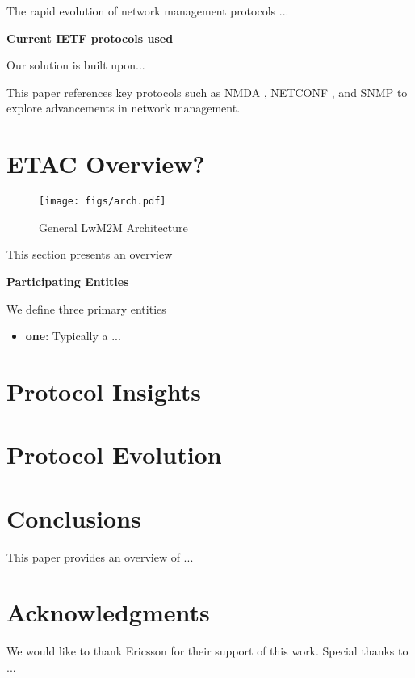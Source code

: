\documentclass[11pt,sigconf]{iabart}
\begin{document}
The rapid evolution of network management protocols ...

\textbf{Current IETF protocols used}

Our solution is built upon...



This paper references key protocols such as NMDA \cite{rfc8342}, NETCONF \cite{rfc6241}, and SNMP \cite{rfc3411} to explore advancements in network management.


\section{ETAC Overview?} \label{overview}

\begin{figure}[h]
  \centering
  \texttt{[image: figs/arch.pdf]}
  \caption{General LwM2M Architecture}
  \label{fig:overall_architecture}
\end{figure}


This section presents an overview

\textbf{Participating Entities}

We define three primary entities

\begin{itemize}
  \item \textbf{one}: Typically a ...
\end{itemize}


\section{Protocol Insights} \label{insights}


\section{Protocol Evolution} \label{insights}



\section{Conclusions} \label{conclusions}

This paper provides an overview of ...

\section{Acknowledgments}

We would like to thank Ericsson for their support of this work. Special thanks to ...



\end{document}
